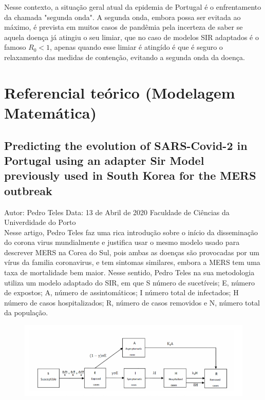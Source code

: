 \documentclass[12pt]{article}
\begin{document}
\newline \newline
Nesse contexto, a situação geral atual da epidemia de Portugal é o enfrentamento da chamada "segunda onda". A segunda onda, embora possa ser evitada ao máximo, é prevista em muitos casos de pandêmia pela incerteza de saber se aquela doença já atingiu o seu limiar, que no caso de modelos SIR adaptados é o famoso $R_0 < 1$, apenas quando esse limiar é atingído é que é seguro o relaxamento das medidas de contenção, evitando a segunda onda da doença.

{\large \section{Referencial teórico (Modelagem Matemática)} }
\newline
\subsection{Predicting the evolution of SARS-Covid-2 in Portugal using an adapter Sir Model previously used in South Korea for the MERS outbreak \cite{ref01}}
Autor: Pedro Teles 
\newline
Data: 13 de Abril de 2020\newline
Faculdade de Ciências da Univerdidade do Porto \\
\newline
Nesse artigo, Pedro Teles faz uma rica introdução sobre o início da disseminação do corona virus mundialmente e justifica usar o mesmo modelo usado para descrever MERS na Corea do Sul, pois ambas as doenças são provocadas por um vírus da familia coronavirus, e tem sintomas similares, embora a MERS tem uma taxa de mortalidade bem maior.
\newline
Nesse sentido, Pedro Teles na sua metodologia utiliza um modelo adaptado do SIR, em que S número de sucetíveis; E, número de expostos; A, número de assintomáticos; I número total de infectados; H número de casos hospitalizados; R, número de casos removidos e N, número total da população.

\begin{figure}[!h]
    \centering
    \includegraphics[scale=0.65]{trab 01.PNG}
\end{figure}
\newline
\end{document}
